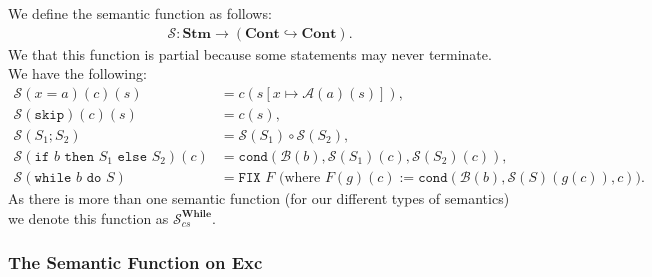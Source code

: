 We define the semantic function as follows: \begin{gather*}
  \mathcal{S}: \textbf{Stm} \to (\textbf{Cont} \hookrightarrow \textbf{Cont}).
\end{gather*} We that this function is partial because some statements
may never terminate. We have the following: \begin{align*}
  \mathcal{S}(x = a)(c)(s) &= c(s[x \mapsto \mathcal{A}(a)(s)]), \\
  \mathcal{S}(\texttt{skip})(c)(s) &= c(s), \\
  \mathcal{S}(S_1 ; S_2) &= \mathcal{S}(S_1) \circ \mathcal{S}(S_2), \\
  \mathcal{S}(\texttt{if } b \texttt{ then } S_1 \texttt{ else } S_2)(c)
  &= \texttt{cond}(\mathcal{B}(b), \mathcal{S}(S_1)(c), \mathcal{S}(S_2)(c)), \\
  \mathcal{S}(\texttt{while } b \texttt{ do } S)
  &= \texttt{FIX } F \text{ (where } F(g)(c) 
  := \texttt{cond}(\mathcal{B}(b), \mathcal{S}(S)(g(c)), c)).
\end{align*} 
As there is more than one semantic function (for our different types
of semantics) we denote this function as $\mathcal{S}_{cs}^{\textbf{While}}$.

\subsubsection{The Semantic Function on \textbf{Exc}} 

